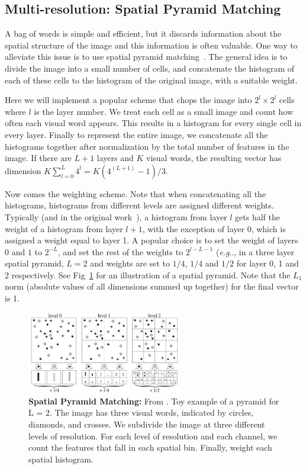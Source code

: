 \documentclass[10pt]{article}
\makeatletter
\DeclareRobustCommand\onedot{\futurelet\@let@token\@onedot}
\def\@onedot{\ifx\@let@token.\else.\null\fi\xspace}
\def\eg{\emph{e.g}\onedot} \def\Eg{\emph{E.g}\onedot}
\makeatother
\begin{document}
\subsection{Multi-resolution: Spatial Pyramid Matching}
A bag of words is simple and efficient, but it discards information about the spatial structure of the image and this information is often valuable. 
One way to alleviate this issue is to use spatial pyramid matching~\cite{1641019}. The general idea is to divide the image into a small number of cells, and concatenate the histogram of each of these cells to the histogram of the original image, with a suitable weight. 

Here we will implement a popular scheme that chops the image into $2^l\times2^l$ cells where $l$ is the layer number. We treat each cell as a small image and count how often each visual word appears. This results in a histogram for every single cell in every layer. Finally to represent the entire image, we concatenate all the histograms together after normalization by the total number of features in the image. If there are $L+1$ layers and $K$ visual words, the resulting vector has dimension $K\sum_{l=0}^L{4^l} = K\left(4^{(L+1)}-1\right)/3$.

Now comes the weighting scheme. Note that when concatenating all the histograms, histograms from different levels are assigned different weights. Typically (and in the original work~\cite{1641019}), a histogram from layer $l$ gets half the weight of a histogram from layer $l+1$, with the exception of layer 0, which is assigned a weight equal to layer 1. A popular choice is to set the weight of layers $0$ and $1$ to $2^{-L}$, and set the rest of the weights to $2^{l-L-1}$ (\eg, in a three layer spatial pyramid, $L=2$ and weights are set to $1/4$, $1/4$ and $1/2$ for layer 0, 1 and 2 respectively. See Fig~\ref{fig:spm} for an illustration of a spatial pyramid. Note that the $L_1$ norm (absolute values of all dimensions summed up together) for the final vector is 1.

\begin{figure}[h]
\centering
\includegraphics[width=0.6\textwidth]{figures/spm.jpg}
\caption{{\bf Spatial Pyramid Matching:} From \cite{1641019}. Toy example of a pyramid for L = 2. The image has three visual words, indicated by circles, diamonds, and crosses. We subdivide
the image at three different levels of resolution. For each level of resolution
and each channel, we count the features that fall in each spatial bin. Finally, 
weight each spatial histogram.}
\label{fig:spm}
\end{figure}
\end{document}
